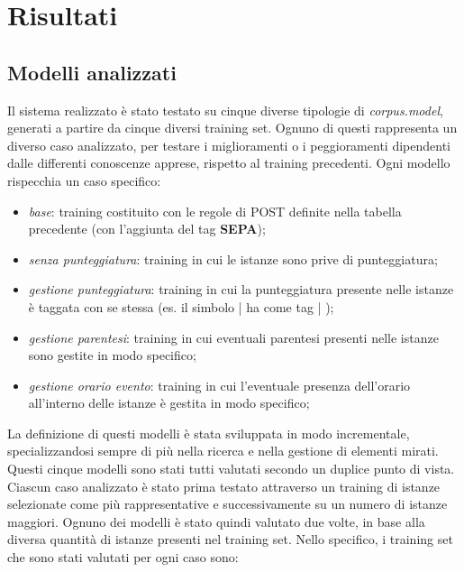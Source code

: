 \documentclass[a4paper]{report}
\begin{document}
\chapter{Risultati}
\section{Modelli analizzati}
Il sistema realizzato è stato testato su cinque diverse tipologie di \textit{corpus.model}, generati a partire da cinque diversi training set. Ognuno di questi rappresenta un diverso caso analizzato, per testare i miglioramenti o i peggioramenti dipendenti dalle differenti conoscenze apprese, rispetto al training precedenti. Ogni modello rispecchia un caso specifico:
\begin{itemize}
\item \textit{base}: training costituito con le regole di POST definite nella tabella precedente (con l'aggiunta del tag \textbf{SEPA});
\item \textit{senza punteggiatura}: training in cui le istanze sono prive di punteggiatura;
\item \textit{gestione punteggiatura}: training in cui la punteggiatura presente nelle istanze è taggata con se stessa (es. il simbolo | ha come tag | );
\item \textit{gestione parentesi}: training in cui eventuali parentesi presenti nelle istanze sono gestite in modo specifico;
\item \textit{gestione orario evento}: training in cui l'eventuale presenza dell'orario all'interno delle istanze è gestita in modo specifico;
\end{itemize}
La definizione di questi modelli è stata sviluppata in modo incrementale, specializzandosi sempre di più nella ricerca e nella gestione di elementi mirati.\\
Questi cinque modelli sono stati tutti valutati secondo un duplice punto di vista. Ciascun caso analizzato è stato prima testato attraverso un training di istanze selezionate come più rappresentative e successivamente su un numero di istanze maggiori. Ognuno dei modelli è stato quindi valutato due volte, in base alla diversa quantità di istanze presenti nel training set. Nello specifico, i training set che sono stati valutati per ogni caso sono:
\\ \\
\end{document}
